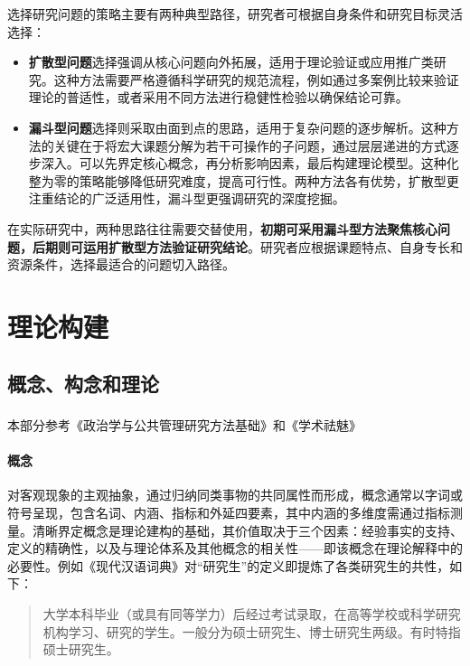 选择研究问题的策略主要有两种典型路径，研究者可根据自身条件和研究目标灵活选择：

\begin{itemize}
	\item
	\textbf{扩散型问题}选择强调从核心问题向外拓展，适用于理论验证或应用推广类研究。这种方法需要严格遵循科学研究的规范流程，例如通过多案例比较来验证理论的普适性，或者采用不同方法进行稳健性检验以确保结论可靠。
	\item
	\textbf{漏斗型问题}选择则采取由面到点的思路，适用于复杂问题的逐步解析。这种方法的关键在于将宏大课题分解为若干可操作的子问题，通过层层递进的方式逐步深入。可以先界定核心概念，再分析影响因素，最后构建理论模型。这种化整为零的策略能够降低研究难度，提高可行性。两种方法各有优势，扩散型更注重结论的广泛适用性，漏斗型更强调研究的深度挖掘。
\end{itemize}

在实际研究中，两种思路往往需要交替使用，\textbf{初期可采用漏斗型方法聚焦核心问题，后期则可运用扩散型方法验证研究结论}。研究者应根据课题特点、自身专长和资源条件，选择最适合的问题切入路径。

\section{理论构建}

\subsection{概念、构念和理论}

本部分参考《政治学与公共管理研究方法基础》和《学术祛魅》\textsuperscript{\cite{3}}

\paragraph*{概念}

对客观现象的主观抽象，通过归纳同类事物的共同属性而形成，概念通常以字词或符号呈现，包含名词、内涵、指标和外延四要素，其中内涵的多维度需通过指标测量。清晰界定概念是理论建构的基础，其价值取决于三个因素：经验事实的支持、定义的精确性，以及与理论体系及其他概念的相关性------即该概念在理论解释中的必要性。例如《现代汉语词典》对``研究生''的定义即提炼了各类研究生的共性，如下：

\begin{quote}
	{\fangsong 大学本科毕业（或具有同等学力）后经过考试录取，在高等学校或科学研究机构学习、研究的学生。一般分为硕士研究生、博士研究生两级。有时特指硕士研究生。
	}
\end{quote}

